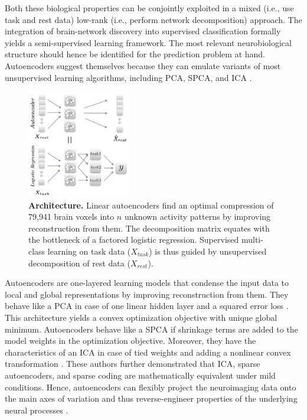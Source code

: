 \documentclass{article} %
\begin{document}
Both these biological properties can be conjointly exploited in a mixed
 (i.e., use task and rest data)
low-rank (i.e., perform network decomposition)
approach.
%
The integration of brain-network discovery into
supervised classification formally yields a semi-supervised learning
framework. The most relevant
neurobiological structure should hence be identified
for the prediction problem at hand.
%
Autoencoders suggest themselves because they can emulate
variants of most unsupervised learning algorithms,
including PCA, SPCA, and ICA \cite{hinton06}.
\begin{figure}
  \centering
    \includegraphics[width=0.40\textwidth]{figures/figure1.png}
  \vspace{-0.7cm}
  \caption {\textbf{Architecture.}
  Linear autoencoders find an optimal compression of 79,941 brain voxels
  into $n$ unknown activity patterns by improving reconstruction from them.
  The decomposition matrix equates with the bottleneck of
  a factored logistic regression.
  Supervised multi-class learning on task data ($X_{task}$)
  is thus guided by
  unsupervised decomposition of rest data ($X_{rest}$).
  }
\end{figure}
%
Autoencoders
are one-layered learning models that condense the input data to
local and global representations
by improving reconstruction from them.
%
They behave like a PCA
in case of one linear hidden layer and a squared error loss
\cite{baldi1989neural}.
This architecture yields a convex optimization objective
with unique global minimum.
Autoencoders behave like a SPCA if shrinkage terms are added to the
model weights in the optimization objective.
Moreover, they have the characteristics of an ICA in case of tied weights
and adding a nonlinear convex transformation \cite{le2011ica}.
These authors further demonstrated that ICA, sparse autoencoders, and 
sparse coding are mathematically equivalent
under mild conditions.
%
Hence, autoencoders can flexibly project the neuroimaging data
onto the main axes of variation and thus
reverse-engineer properties of the underlying
neural processes \cite{olshausen96}.
\end{document}
